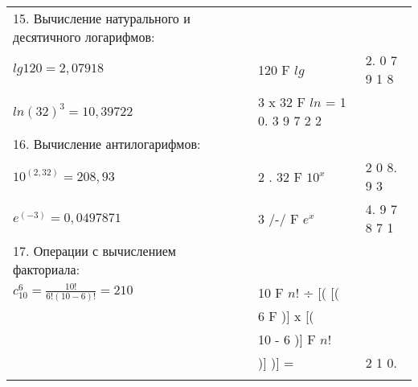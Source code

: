 \documentclass[12pt]{article} %
\begin{document}
\begin{tabular}{ p{5cm} p{4cm} p{4cm} }
    15. Вычисление натурального и десятичного логарифмов: \\
    $lg 120 = 2,07918$ & 120  F  $lg$ & 2. 0 7 9 1 8 \\
    $ln (32)^3 = 10,39722$ & 3 x 32  F  $ln$  =  1 0. 3 9 7 2 2 \\
    \vspace{0.1cm}

    16. Вычисление антилогарифмов: \\
    $10^(2,32) = 208,93$ & 2 . 32  F  $10^x$ &  2 0 8. 9 3 \\
    $e^(-3) = 0,0497871$ & 3 /-/   F  $e^x$  &  4. 9 7 8 7 1 \\
    \vspace{0.1cm}

    17. Операции с вычислением факториала: \\
    $c^{6}_{10} = \frac{10!}{6!(10-6)!} = 210$ & 10  F  $n!$ ÷ [( [( \\
                                               & 6  F  )]  x  [( & \\ 
                                               & 10 - 6 )]  F  $n!$ & \\
                                               & )] )]  = & 2 1 0. \\
    \vspace{0.1cm}

\end{tabular}
\end{document}
